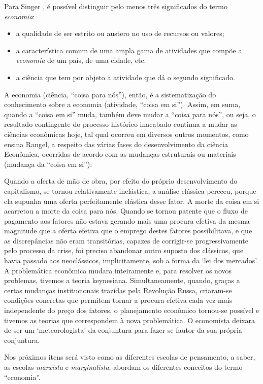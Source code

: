 \documentclass[
	12pt,				%
	oneside,			%
	a4paper,			%
	chapter=TITLE,		%
	section=TITLE,		%
	english,			%
	brazil				%
	]{abntex2}
\begin{document}
\begin{refsection}
Para Singer \autocite*[7]{singer}, é possível distinguir pelo menos três significados do
termo \emph{economia}:
\begin{itemize}
\tightlist
\item
  a qualidade de ser estrito ou austero no uso de recursos ou valores;
\item
  a característica comum de uma ampla gama de atividades que compõe a \emph{economia}
  de um país, de uma cidade, etc.
\item
  a ciência que tem por objeto a atividade que dá o segundo significado.
\end{itemize}
A economia (ciência, ``coisa para nós''), então, é a sistematização do
conhecimento sobre a economia (atividade, ``coisa em si''). Assim, em suma, quando
a ``coisa em si'' muda, também deve mudar a ``coisa para nós'', ou seja, o resultado
contingente do processo histórico inacabado continua a mudar as ciências
econômicas hoje, tal qual ocorreu em diversos outros momentos, como ensina
Rangel, a respeito das várias fases do desenvolvimento da ciência Econômica,
ocorridas de acordo com as mudanças estruturais ou materiais (mudança da
``coisa em si''):
\begin{citacao}
Quando a oferta de mão de obra, por efeito do próprio desenvolvimento do 
capitalismo, se tornou relativamente inelástica, a análise clássica pereceu, 
porque ela supunha uma oferta perfeitamente elástica desse fator. A morte da 
coisa em si acarretou a morte da coisa para nós.
Quando se tornou patente que o fluxo de pagamento aos fatores não estava gerando
mais uma procura efetiva da mesma magnitude que a oferta efetiva que o emprego
destes fatores possibilitava, e que as discrepâncias não eram transitórias,
capazes de corrigir-se progressivamente pelo processo da crise, foi preciso 
abandonar outro suposto dos clássicos, que havia passado aos neoclássicos, 
implicitamente, sob a forma da `lei dos mercados'. A problemática econômica
mudara inteiramente e, para resolver os novos problemas, tivemos a teoria
keynesiana.
Simultaneamente, quando, graças a certas mudanças institucionais trazidas pela
Revolução Russa, criaram-se condições concretas que permitem tornar a procura
efetiva cada vez mais independente do preço dos fatores, o planejamento 
econômico tornou-se possível e tivemos as teorias que correspondem à nova
problemática. O economista deixara de ser um `meteorologista' da conjuntura
para fazer-se fautor da sua própria conjuntura.
\cite[p.~206]{rangel1956}
\end{citacao}
Nos próximos itens será visto como as diferentes escolas de pensamento, a saber,
as escolas \emph{marxista} e \emph{marginalista}, abordam os diferentes conceitos do termo
``economia''.


\end{refsection}
\end{document}
